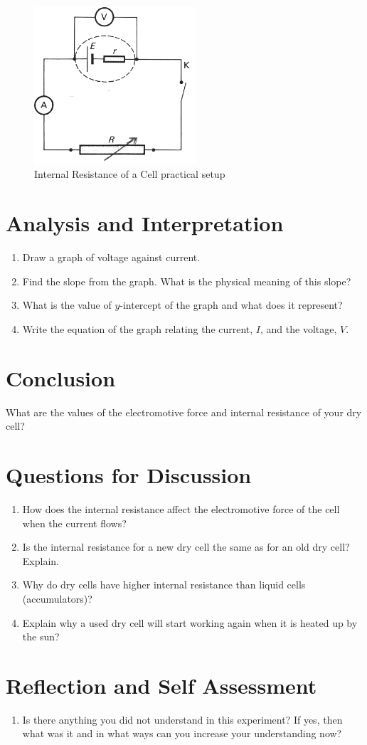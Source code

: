 \begin{figure}[h!]
\centering
\includegraphics[width=6cm]{./img/internal-resistance-1.png}
\caption{Internal Resistance of a Cell practical setup}
\label{fig:internal-resistance-1}
\end{figure}

\section{Analysis and Interpretation}
\begin{enumerate}
\item Draw a graph of voltage against current.
\item Find the slope from the graph. What is the physical meaning of this slope?
\item What is the value of $y$-intercept of the graph and what does it represent?
\item Write the equation of the graph relating the current, $I$, and the voltage, $V$.
\end{enumerate}

\section{Conclusion}
What are the values of the electromotive force and internal resistance of your dry cell?

\section{Questions for Discussion}
\begin{enumerate}
\item How does the internal resistance affect the electromotive force of the cell when the current flows? 
\item Is the internal resistance for a new dry cell the same as for an old dry cell? Explain.
\item Why do dry cells have higher internal resistance than liquid cells (accumulators)?
\item Explain why a used dry cell will start working again when it is heated up by the sun?
\end{enumerate}

\section{Reflection and Self Assessment}
\begin{enumerate}
\item Is there anything you did not understand in this experiment? If yes, then what was it and in what ways can you increase your understanding now?
\end{enumerate}
